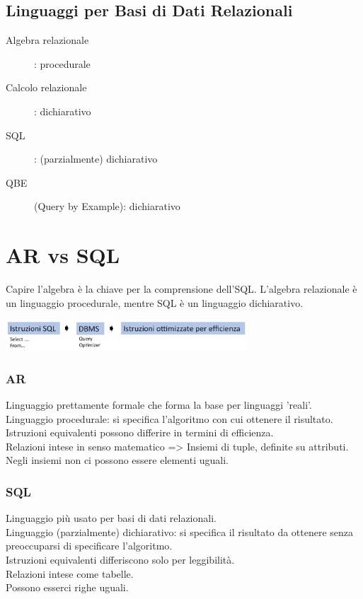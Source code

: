 \subsection{Linguaggi per Basi di Dati Relazionali} 
\begin{description}
    \item[Algebra relazionale]: procedurale
    \item[Calcolo relazionale]: dichiarativo 
    \item[SQL]: (parzialmente) dichiarativo 
    \item[QBE](Query by Example): dichiarativo
\end{description}

\section{AR vs SQL}
Capire l'algebra è la chiave per la comprensione dell'SQL. L'algebra relazionale è un linguaggio procedurale, mentre SQL è un linguaggio dichiarativo.
\begin{center}
    \includegraphics[width=0.675\textwidth]{chaptersLezioniSara/img/AR_linguaggi2.jpg}
\end{center}

\subsubsection{AR}
Linguaggio prettamente formale che forma la base per linguaggi 'reali'.
\\Linguaggio procedurale: si specifica l'algoritmo con cui ottenere il risultato.
\\Istruzioni equivalenti possono differire in termini di efficienza.
\\Relazioni intese in senso matematico => Insiemi di tuple, definite su attributi.
\\Negli insiemi non ci possono essere elementi uguali.

\subsubsection{SQL}
Linguaggio più usato per basi di dati relazionali.
\\Linguaggio (parzialmente) dichiarativo: si specifica il risultato da ottenere senza preoccuparsi di specificare l'algoritmo.
\\Istruzioni equivalenti differiscono solo per leggibilità.
\\Relazioni intese come tabelle.
\\Possono esserci righe uguali.

